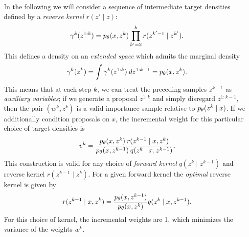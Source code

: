 \documentclass{article}
\theoremstyle{definition}
\begin{document}
In the following we will consider a sequence of intermediate target densities defined by a \emph{reverse kernel} $r(z' \mid z)$:
\begin{align*}
    \gamma^k(z^{1:k})
    =
    p_\theta(x,z^k) \prod_{k'=2}^{k} r(z^{k'-1} \mid z^{k'})
    .
\end{align*}
This defines a density on an \emph{extended space} which admits the marginal density
\begin{align*}
    \gamma^k(z^k) = \int \gamma^k(z^{1:k}) \: dz^{1:k-1} = p_\theta(x, z^k).
\end{align*}
This means that at each step $k$, we can treat the preceding samples $z^{k-1}$ as \emph{auxiliary variables}; if we generate a proposal $z^{1:k}$ and simply disregard $z^{1:k-1}$, then the pair $(w^k, z^k)$ is a valid importance sample relative to $p_\theta(z^k \mid x)$. If we additionally condition proposals on $x$, the incremental weight for this particular choice of target densities is
\begin{align}
    \label{eq:incremental-weight-forward-reverse}
    v^k 
    = 
    \frac{p_\theta(x,z^k) \: r(z^{k-1} \mid x, z^k)}
         {p_\theta(x,z^{k-1}) \: q(z^{k} \mid x, z^{k-1})}
    .
\end{align}
This construction is valid for any choice of \emph{forward kernel}  $q(z^k \mid z^{k-1})$ and reverse kernel $r(z^{k-1} \mid z^{k})$. For a given forward kernel the \emph{optimal} reverse kernel is given by
\begin{align*}
    r(z^{k-1} \mid x, z^k)
    =   
    \frac{p_\theta(x, z^{k-1})}
         {p_\theta(x, z^k)}
    q(z^{k} \mid x, z^{k-1})
    .
\end{align*}
For this choice of kernel, the incremental weights are 1, which minimizes the variance of the weights $w^k$.
\end{document}
